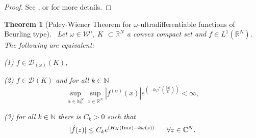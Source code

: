 \documentclass[twoside]{amsart}
\newtheorem{Th}{Theorem}[section]
\begin{document}
\begin{proof}
See \cite[Prop. 3.4]{BMT}, or \cite{G} for more details.
\end{proof}

\begin{Th}[Paley-Wiener Theorem for $\omega$-ultradifferentiable
functions of Beurling type]
\label{prop:2.3.6}
\ 
Let $\omega\in{\mathcal{W}}'$, $K$ $\subset\mathbb{R}^{N}$ a convex compact set
and $f\in L^{1}(\mathbb{R}^{N})$. 
The following are equivalent:

(1) $f\in{\mathcal{D}}_{(\omega)}(K)$,

(2) $f\in{\mathcal{D}}(K)$ and for all $k\in\mathbb{N}$
\[
\underset{\alpha\in\mathbb{N}_{0}^{N}}{\sup}
\underset{x\in\mathbb{R}^{N}}{\sup}|f^{(\alpha)}(x)|
e^{\left(-k\varphi^{*}(\frac{|\alpha|}{k})\right)}<\infty,
\]

(3) for all $k\in\mathbb{N}$ there is $C_{k}>0$ such that
\[
|\hat{f}(z)|\leq C_{k}e^{\left(H_{K}({\mathop{\rm Im}\nolimits} z)-k\omega(z)\right)}
\,\,\,\,\,\,\,\,\,\,\forall z\in\mathbb{C}^{N}.
\]
\end{Th}
\end{document}
